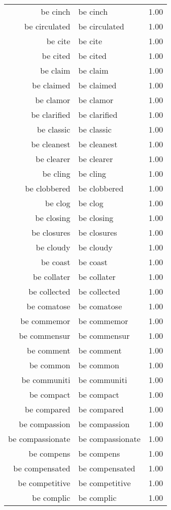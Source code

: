 \begin{table}[ht]
\begin{tabular}{rlr}
  be cinch & be cinch & 1.00 \\ 
  be circulated & be circulated & 1.00 \\ 
  be cite & be cite & 1.00 \\ 
  be cited & be cited & 1.00 \\ 
  be claim & be claim & 1.00 \\ 
  be claimed & be claimed & 1.00 \\ 
  be clamor & be clamor & 1.00 \\ 
  be clarified & be clarified & 1.00 \\ 
  be classic & be classic & 1.00 \\ 
  be cleanest & be cleanest & 1.00 \\ 
  be clearer & be clearer & 1.00 \\ 
  be cling & be cling & 1.00 \\ 
  be clobbered & be clobbered & 1.00 \\ 
  be clog & be clog & 1.00 \\ 
  be closing & be closing & 1.00 \\ 
  be closures & be closures & 1.00 \\ 
  be cloudy & be cloudy & 1.00 \\ 
  be coast & be coast & 1.00 \\ 
  be collater & be collater & 1.00 \\ 
  be collected & be collected & 1.00 \\ 
  be comatose & be comatose & 1.00 \\ 
  be commemor & be commemor & 1.00 \\ 
  be commensur & be commensur & 1.00 \\ 
  be comment & be comment & 1.00 \\ 
  be common & be common & 1.00 \\ 
  be communiti & be communiti & 1.00 \\ 
  be compact & be compact & 1.00 \\ 
  be compared & be compared & 1.00 \\ 
  be compassion & be compassion & 1.00 \\ 
  be compassionate & be compassionate & 1.00 \\ 
  be compens & be compens & 1.00 \\ 
  be compensated & be compensated & 1.00 \\ 
  be competitive & be competitive & 1.00 \\ 
  be complic & be complic & 1.00 \\ 

\end{tabular}
\end{table}
